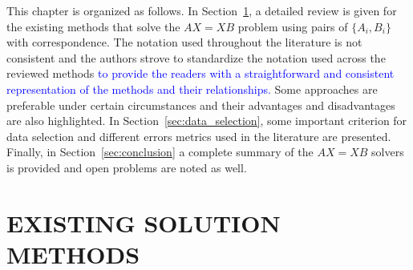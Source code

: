 \documentclass[twocolumn,10pt]{asme2ej}
\begin{document}
%
%
This chapter is organized as follows. 
In Section~\ref{sec:sol_methods}, a detailed review is given for the existing methods that solve the $AX=XB$ problem using pairs of $\{A_{i}, B_{i}\}$ with correspondence. The notation used throughout the literature is not consistent and the authors strove %
to standardize the notation used across the reviewed methods
\textcolor{blue}{to provide the readers with a straightforward and consistent representation of the methods and their relationships.} %
Some approaches are preferable under certain circumstances and their advantages and disadvantages are also highlighted. 
In Section~\ref{sec:data_selection}, some important criterion for data selection and different errors metrics used in the literature are presented. 
Finally, in Section~\ref{sec:conclusion} a complete summary of the $AX=XB$ solvers is provided and open problems are noted as well.    

\section{EXISTING SOLUTION METHODS}
\label{sec:sol_methods}
 
\end{document}
